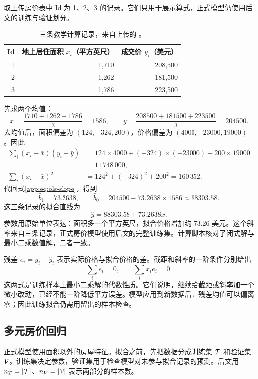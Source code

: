 取上传房价表中 Id 为 1、2、3 的记录。它们只用于展示算式，正式模型仍使用后文的训练与验证划分。
\begin{table}[htbp]\centering
\begin{tabular}{rrr}\toprule
Id & 地上居住面积 $x_i$（平方英尺） & 成交价 $y_i$（美元）\\\midrule
1 & 1,710 & 208,500\\
2 & 1,262 & 181,500\\
3 & 1,786 & 223,500\\\bottomrule
\end{tabular}
\caption{三条教学计算记录，来自上传的 。}
\end{table}
先求两个均值：
\[
\bar x=\frac{1710+1262+1786}{3}=1586,
\qquad
\bar y=\frac{208500+181500+223500}{3}=204500.
\]
去均值后，面积偏差为 $(124,-324,200)$，价格偏差为 $(4000,-23000,19000)$。因此
\begin{align*}
\sum_i(x_i-\bar x)(y_i-\bar y)
&=124\times4000+(-324)\times(-23000)+200\times19000\\
&=11\,748\,000,\\
\sum_i(x_i-\bar x)^2&=124^2+(-324)^2+200^2=160\,352.
\end{align*}
代回式\eqref{app:eq:ols-slope}，得到
\[
\hat b_1=73.2638,\qquad
\hat b_0=204500-73.2638\times1586\approx88303.58.
\]
这三条记录的拟合直线为
\begin{equation}
\hat y=88303.58+73.2638x.
\end{equation}
参数用原始单位表达：面积多一个平方英尺，拟合价格增加约 73.26 美元。这个斜率来自三条记录，正式房价模型使用后文的完整训练集。计算脚本核对了闭式解与最小二乘数值解，二者一致。

残差 $e_i=y_i-\hat y_i$ 表示实际价格与拟合价格的差。截距和斜率的一阶条件分别给出
\begin{equation}\label{app:eq:ols-orthogonal}
\sum_i e_i=0,\qquad \sum_i x_ie_i=0.
\end{equation}
这两式是训练样本上最小二乘解的代数性质。它们说明，继续给截距或斜率加一个微小改动，已经不能一阶降低平方误差。模型应用到新数据后，残差均值可以偏离零；因此训练拟合仍需用留出的样本检查。


\subsection{多元房价回归}
正式模型使用面积以外的房屋特征。拟合之前，先把数据分成训练集 $\mathcal{T}$ 和验证集 $\mathcal{V}$。训练集决定参数，验证集用于检查模型对未参与拟合记录的预测。后文用 $n_T=|\mathcal{T}|$、$n_V=|\mathcal{V}|$ 表示两部分的样本数。


